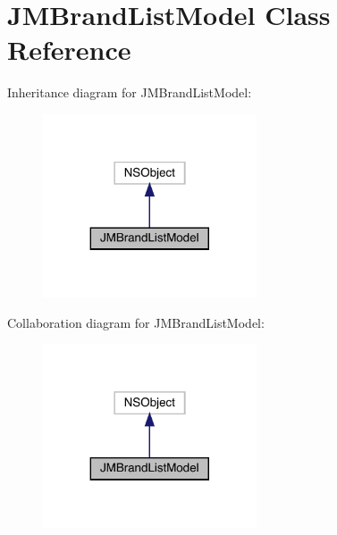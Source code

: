 \hypertarget{interface_j_m_brand_list_model}{}\section{J\+M\+Brand\+List\+Model Class Reference}
\label{interface_j_m_brand_list_model}


Inheritance diagram for J\+M\+Brand\+List\+Model\+:\nopagebreak
\begin{figure}[H]
\begin{center}
\leavevmode
\includegraphics[width=179pt]{interface_j_m_brand_list_model__inherit__graph}
\end{center}
\end{figure}


Collaboration diagram for J\+M\+Brand\+List\+Model\+:\nopagebreak
\begin{figure}[H]
\begin{center}
\leavevmode
\includegraphics[width=179pt]{interface_j_m_brand_list_model__coll__graph}
\end{center}
\end{figure}
